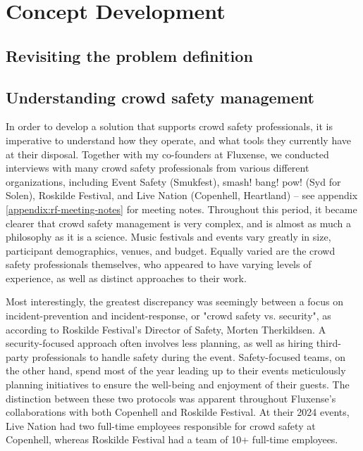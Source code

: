 \chapter{Concept Development}
\label{chap:concept-development}

\section{Revisiting the problem definition}



\section{Understanding crowd safety management}
\label{sec:crowd-safety}

In order to develop a solution that supports crowd safety professionals, it is imperative to understand how they operate, and what tools they currently have at their disposal. Together with my co-founders at Fluxense, we conducted interviews with many crowd safety professionals from various different organizations, including Event Safety (Smukfest), smash! bang! pow! (Syd for Solen), Roskilde Festival, and Live Nation (Copenhell, Heartland) -- see appendix \ref{appendix:rf-meeting-notes} for meeting notes. Throughout this period, it became clearer that crowd safety management is very complex, and is almost as much a philosophy as it is a science. Music festivals and events vary greatly in size, participant demographics, venues, and budget. Equally varied are the crowd safety professionals themselves, who appeared to have varying levels of experience, as well as distinct approaches to their work.

Most interestingly, the greatest discrepancy was seemingly between a focus on incident-prevention and incident-response, or "crowd safety vs. security", as according to Roskilde Festival's Director of Safety, Morten Therkildsen. A security-focused approach often involves less planning, as well as hiring third-party professionals to handle safety during the event. Safety-focused teams, on the other hand, spend most of the year leading up to their events meticulously planning initiatives to ensure the well-being and enjoyment of their guests. The distinction between these two protocols was apparent throughout Fluxense's collaborations with both Copenhell and Roskilde Festival. At their 2024 events, Live Nation had two full-time employees responsible for crowd safety at Copenhell, whereas Roskilde Festival had a team of 10+ full-time employees.

